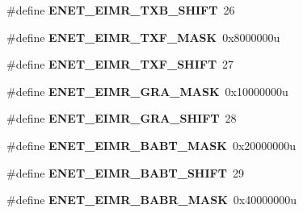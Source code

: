 \begin{DoxyCompactItemize}
\item 
\#define {\bfseries E\+N\+E\+T\+\_\+\+E\+I\+M\+R\+\_\+\+T\+X\+B\+\_\+\+S\+H\+I\+FT}~26\hypertarget{group__ENET__Register__Masks_gac105b6e74a6dea995d1aba52557c6652}{}\label{group__ENET__Register__Masks_gac105b6e74a6dea995d1aba52557c6652}

\item 
\#define {\bfseries E\+N\+E\+T\+\_\+\+E\+I\+M\+R\+\_\+\+T\+X\+F\+\_\+\+M\+A\+SK}~0x8000000u\hypertarget{group__ENET__Register__Masks_ga82cff30c63a5da6e1c8f258ec2ba58b6}{}\label{group__ENET__Register__Masks_ga82cff30c63a5da6e1c8f258ec2ba58b6}

\item 
\#define {\bfseries E\+N\+E\+T\+\_\+\+E\+I\+M\+R\+\_\+\+T\+X\+F\+\_\+\+S\+H\+I\+FT}~27\hypertarget{group__ENET__Register__Masks_gab7b9fcb8d862613d25705d25cde3bc2d}{}\label{group__ENET__Register__Masks_gab7b9fcb8d862613d25705d25cde3bc2d}

\item 
\#define {\bfseries E\+N\+E\+T\+\_\+\+E\+I\+M\+R\+\_\+\+G\+R\+A\+\_\+\+M\+A\+SK}~0x10000000u\hypertarget{group__ENET__Register__Masks_gab98df36a19739e86d31288f174b02808}{}\label{group__ENET__Register__Masks_gab98df36a19739e86d31288f174b02808}

\item 
\#define {\bfseries E\+N\+E\+T\+\_\+\+E\+I\+M\+R\+\_\+\+G\+R\+A\+\_\+\+S\+H\+I\+FT}~28\hypertarget{group__ENET__Register__Masks_gaf521660efa515ae8165bfae1239c623d}{}\label{group__ENET__Register__Masks_gaf521660efa515ae8165bfae1239c623d}

\item 
\#define {\bfseries E\+N\+E\+T\+\_\+\+E\+I\+M\+R\+\_\+\+B\+A\+B\+T\+\_\+\+M\+A\+SK}~0x20000000u\hypertarget{group__ENET__Register__Masks_gae9646ae2a082e18adeb6a1c2e654a821}{}\label{group__ENET__Register__Masks_gae9646ae2a082e18adeb6a1c2e654a821}

\item 
\#define {\bfseries E\+N\+E\+T\+\_\+\+E\+I\+M\+R\+\_\+\+B\+A\+B\+T\+\_\+\+S\+H\+I\+FT}~29\hypertarget{group__ENET__Register__Masks_gad0fc34be1abc0e6059feb0ac0f7e7db1}{}\label{group__ENET__Register__Masks_gad0fc34be1abc0e6059feb0ac0f7e7db1}

\item 
\#define {\bfseries E\+N\+E\+T\+\_\+\+E\+I\+M\+R\+\_\+\+B\+A\+B\+R\+\_\+\+M\+A\+SK}~0x40000000u\hypertarget{group__ENET__Register__Masks_ga58e5d69da07a75b36ef7d5fe01b5275d}{}\label{group__ENET__Register__Masks_ga58e5d69da07a75b36ef7d5fe01b5275d}


\end{DoxyCompactItemize}
